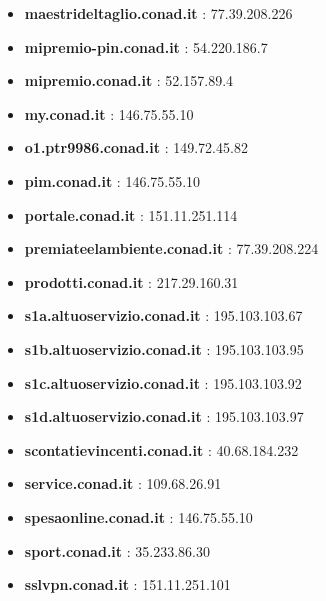 \documentclass{article}
\begin{document}
\begin{itemize}
        \item \textbf{ maestrideltaglio.conad.it }: 77.39.208.226
    
        \item \textbf{ mipremio-pin.conad.it }: 54.220.186.7
    
        \item \textbf{ mipremio.conad.it }: 52.157.89.4
    
        \item \textbf{ my.conad.it }: 146.75.55.10
    
        \item \textbf{ o1.ptr9986.conad.it }: 149.72.45.82
    
        \item \textbf{ pim.conad.it }: 146.75.55.10
    
        \item \textbf{ portale.conad.it }: 151.11.251.114
    
        \item \textbf{ premiateelambiente.conad.it }: 77.39.208.224
    
        \item \textbf{ prodotti.conad.it }: 217.29.160.31
    
        \item \textbf{ s1a.altuoservizio.conad.it }: 195.103.103.67
    
        \item \textbf{ s1b.altuoservizio.conad.it }: 195.103.103.95
    
        \item \textbf{ s1c.altuoservizio.conad.it }: 195.103.103.92
    
        \item \textbf{ s1d.altuoservizio.conad.it }: 195.103.103.97
    
        \item \textbf{ scontatievincenti.conad.it }: 40.68.184.232
    
        \item \textbf{ service.conad.it }: 109.68.26.91
    
        \item \textbf{ spesaonline.conad.it }: 146.75.55.10
    
        \item \textbf{ sport.conad.it }: 35.233.86.30
    
        \item \textbf{ sslvpn.conad.it }: 151.11.251.101
    

\end{itemize}
\end{document}
